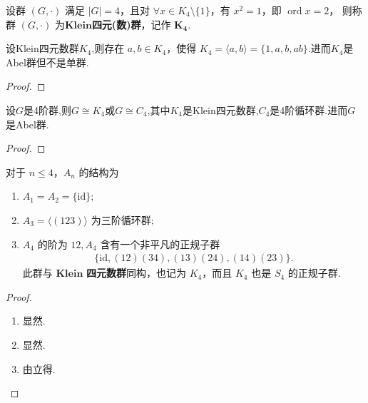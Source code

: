 \documentclass[../../main.tex]{subfiles}%
\begin{document}
\begin{definition}[Klein四元数群]
设群 $(G,\cdot)$ 满足 $|G|=4$，且对 $\forall x\in K_4\setminus\{1\}$，有 $x^2=1$，即 $\operatorname{ord}x=2$，
则称群 $(G,\cdot)$ 为$\mathbf{Klein}$\textbf{四元(数)群}，记作 $\bm{K_4}$.
\end{definition}

\begin{theorem}\label{theorem:Klein四元数群的基本性质}
设Klein四元数群$K_4$,则存在 $a,b\in K_4$，使得 $K_4=\langle a,b\rangle=\{1,a,b,ab\}$.进而$K_4$是Abel群但不是单群.
\end{theorem}
\begin{proof}

    

\end{proof}

\begin{proposition}\label{proposition:4阶群只有两个4阶循环群和Klein四元群}
设$G$是4阶群,则$G\cong K_4$或$G\cong C_4$,其中$K_4$是Klein四元数群,$C_4$是4阶循环群.进而$G$是Abel群.
\end{proposition}
\begin{proof}



\end{proof}

\begin{proposition}
对于 \( n \leqslant 4 \)，\( A_n \) 的结构为
\begin{enumerate}[(1)]
\item $A_1 = A_2 = \{\mathrm{id}\};$

\item $A_3 = \langle (123) \rangle \text{ 为三阶循环群}; $

\item $A_4 \text{ 的阶为 12}, A_4 \text{ 含有一个非平凡的正规子群}$
\begin{align*}
\{\mathrm{id}, (12)(34), (13)(24), (14)(23)\}.
\end{align*}
此群与 $\mathbf{Klein}$ \textbf{四元数群}同构，也记为 \( K_4 \)，而且 \( K_4 \) 也是 \( S_4 \) 的正规子群.
\end{enumerate}
\end{proposition}
\begin{proof}
\begin{enumerate}[(1)]
\item 显然.

\item 显然.

\item 由立得.
\end{enumerate}

\end{proof}
\end{document}
